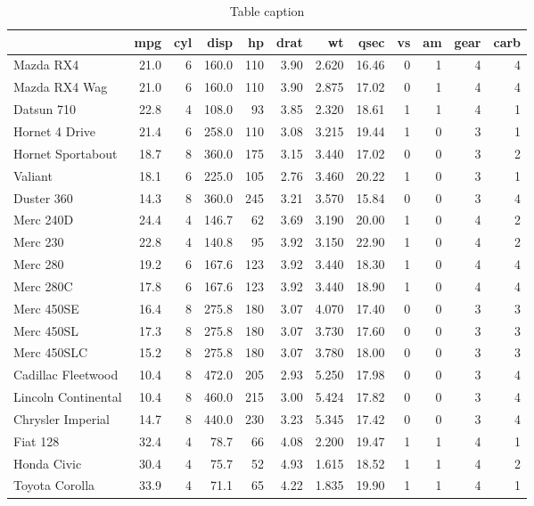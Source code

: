 \documentclass[aoas]{imsart}
\numberwithin{equation}{section}
\theoremstyle{plain}
\theoremstyle{remark}
\begin{document}
\begin{table}

\caption{\label{tab:mtc}Table caption}
\centering
\begin{tabular}[t]{lrrrrrrrrrrr}
\hline
  & mpg & cyl & disp & hp & drat & wt & qsec & vs & am & gear & carb\\
\hline
Mazda RX4 & 21.0 & 6 & 160.0 & 110 & 3.90 & 2.620 & 16.46 & 0 & 1 & 4 & 4\\
Mazda RX4 Wag & 21.0 & 6 & 160.0 & 110 & 3.90 & 2.875 & 17.02 & 0 & 1 & 4 & 4\\
Datsun 710 & 22.8 & 4 & 108.0 & 93 & 3.85 & 2.320 & 18.61 & 1 & 1 & 4 & 1\\
Hornet 4 Drive & 21.4 & 6 & 258.0 & 110 & 3.08 & 3.215 & 19.44 & 1 & 0 & 3 & 1\\
Hornet Sportabout & 18.7 & 8 & 360.0 & 175 & 3.15 & 3.440 & 17.02 & 0 & 0 & 3 & 2\\
Valiant & 18.1 & 6 & 225.0 & 105 & 2.76 & 3.460 & 20.22 & 1 & 0 & 3 & 1\\
Duster 360 & 14.3 & 8 & 360.0 & 245 & 3.21 & 3.570 & 15.84 & 0 & 0 & 3 & 4\\
Merc 240D & 24.4 & 4 & 146.7 & 62 & 3.69 & 3.190 & 20.00 & 1 & 0 & 4 & 2\\
Merc 230 & 22.8 & 4 & 140.8 & 95 & 3.92 & 3.150 & 22.90 & 1 & 0 & 4 & 2\\
Merc 280 & 19.2 & 6 & 167.6 & 123 & 3.92 & 3.440 & 18.30 & 1 & 0 & 4 & 4\\
Merc 280C & 17.8 & 6 & 167.6 & 123 & 3.92 & 3.440 & 18.90 & 1 & 0 & 4 & 4\\
Merc 450SE & 16.4 & 8 & 275.8 & 180 & 3.07 & 4.070 & 17.40 & 0 & 0 & 3 & 3\\
Merc 450SL & 17.3 & 8 & 275.8 & 180 & 3.07 & 3.730 & 17.60 & 0 & 0 & 3 & 3\\
Merc 450SLC & 15.2 & 8 & 275.8 & 180 & 3.07 & 3.780 & 18.00 & 0 & 0 & 3 & 3\\
Cadillac Fleetwood & 10.4 & 8 & 472.0 & 205 & 2.93 & 5.250 & 17.98 & 0 & 0 & 3 & 4\\
Lincoln Continental & 10.4 & 8 & 460.0 & 215 & 3.00 & 5.424 & 17.82 & 0 & 0 & 3 & 4\\
Chrysler Imperial & 14.7 & 8 & 440.0 & 230 & 3.23 & 5.345 & 17.42 & 0 & 0 & 3 & 4\\
Fiat 128 & 32.4 & 4 & 78.7 & 66 & 4.08 & 2.200 & 19.47 & 1 & 1 & 4 & 1\\
Honda Civic & 30.4 & 4 & 75.7 & 52 & 4.93 & 1.615 & 18.52 & 1 & 1 & 4 & 2\\
Toyota Corolla & 33.9 & 4 & 71.1 & 65 & 4.22 & 1.835 & 19.90 & 1 & 1 & 4 & 1\\

\end{tabular}
\end{table}
\end{document}
